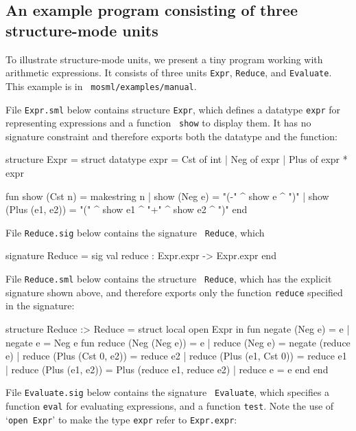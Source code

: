 \documentclass[fleqn,a4paper]{article}
\begin{document}
\subsection{An example program consisting of three structure-mode units}
\label{sec-example-units}

To illustrate structure-mode units, we present a tiny program working
with arithmetic expressions.  It consists of three units {\tt Expr},
{\tt Reduce}, and {\tt Evaluate}.  This example is in {\tt
  mosml/examples/manual}.

File {\tt Expr.sml} below contains structure {\tt Expr}, which defines
a datatype {\tt expr} for representing expressions and a function {\tt
  show} to display them.  It has no signature constraint and therefore
exports both the datatype and the function:

\begin{program}
structure Expr = struct
   datatype expr = Cst of int | Neg of expr | Plus of expr * expr

   fun show (Cst n)         = makestring n
     | show (Neg e)         = "(-" ^ show e ^ ")"
     | show (Plus (e1, e2)) = "(" ^ show e1 ^ "+" ^ show e2 ^ ")"
end
\end{program}

\noindent File {\tt Reduce.sig} below contains the signature  {\tt
  Reduce}, which 

\begin{program}
signature Reduce = sig
   val reduce : Expr.expr -> Expr.expr
end
\end{program}

\noindent File {\tt Reduce.sml} below contains the structure {\tt
  Reduce}, which has the explicit signature shown above, and therefore
exports only the function {\tt reduce} specified in the signature:

\begin{program}
structure Reduce :> Reduce = struct 
   local open Expr
   in
       fun negate (Neg e) = e
         | negate e       = Neg e
       fun reduce (Neg (Neg e))      = e
         | reduce (Neg e)            = negate (reduce e)
         | reduce (Plus (Cst 0, e2)) = reduce e2
         | reduce (Plus (e1, Cst 0)) = reduce e1
         | reduce (Plus (e1, e2))    = Plus (reduce e1, reduce e2)
         | reduce e                  = e
   end
end
\end{program}

\noindent File {\tt Evaluate.sig} below contains the signature {\tt
  Evaluate}, which specifies a function {\tt eval} for evaluating
expressions, and a function {\tt test}.  Note the use of `{\tt open
  Expr}' to make the type {\tt expr} refer to {\tt Expr.expr}:
\end{document}
